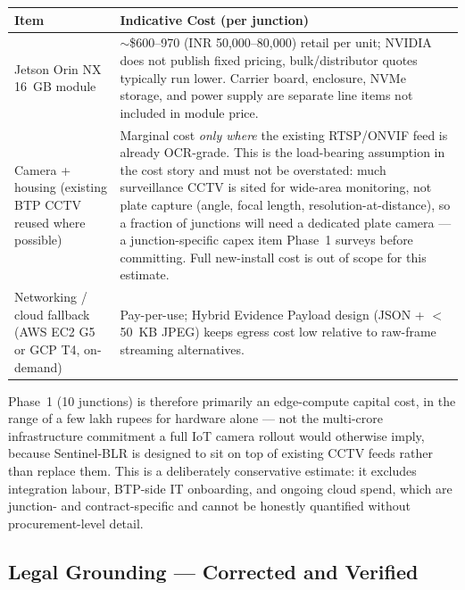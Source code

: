 \documentclass[11pt,a4paper]{article}
\renewcommand{\arraystretch}{1.35}
\begin{document}
{
\centering
\setlength{\tabcolsep}{5pt}
\renewcommand{\arraystretch}{0.95}
\begin{tabular}{L{4.5cm} L{8.5cm}}
    \toprule
    \color{white}\textbf{Item} & \color{white}\textbf{Indicative Cost (per junction)} \\
    \midrule
    Jetson Orin NX 16~GB module & $\sim$\$600--970 (INR 50,000--80,000) retail per unit; NVIDIA does not publish fixed pricing, bulk/distributor quotes typically run lower. Carrier board, enclosure, NVMe storage, and power supply are separate line items not included in module price. \\
    Camera + housing (existing BTP CCTV reused where possible) & Marginal cost \emph{only where} the existing RTSP/ONVIF feed is already OCR-grade. This is the load-bearing assumption in the cost story and must not be overstated: much surveillance CCTV is sited for wide-area monitoring, not plate capture (angle, focal length, resolution-at-distance), so a fraction of junctions will need a dedicated plate camera --- a junction-specific capex item Phase~1 surveys before committing. Full new-install cost is out of scope for this estimate. \\
    Networking / cloud fallback (AWS EC2 G5 or GCP T4, on-demand) & Pay-per-use; Hybrid Evidence Payload design (JSON + $<$50~KB JPEG) keeps egress cost low relative to raw-frame streaming alternatives. \\
    \bottomrule
\end{tabular}
\par
}

\vspace{0.6em}

\noindent Phase~1 (10 junctions) is therefore primarily an edge-compute capital cost, in the range of a few lakh rupees for hardware alone --- not the multi-crore infrastructure commitment a full IoT camera rollout would otherwise imply, because Sentinel-BLR is designed to sit on top of existing CCTV feeds rather than replace them. This is a deliberately conservative estimate: it excludes integration labour, BTP-side IT onboarding, and ongoing cloud spend, which are junction- and contract-specific and cannot be honestly quantified without procurement-level detail.

\subsection*{Legal Grounding --- Corrected and Verified}
\end{document}
